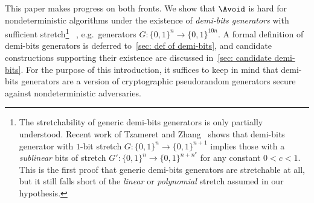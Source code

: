 \documentclass[10pt,a4paper]{article}
\theoremstyle{definition}
\theoremstyle{remark}
\begin{document}
This paper makes progress on both fronts. We show that $\Avoid$ is hard for nondeterministic algorithms under the existence of \emph{demi-bits generators} with sufficient stretch\footnote{The stretchability of generic demi-bits generators is only partially understood. Recent work of Tzameret and Zhang~\cite{tzameret_et_al:LIPIcs.ITCS.2024.95} shows that demi-bits generator with $1$-bit stretch $G : \{0, 1\}^n \to \{0, 1\}^{n+1}$ implies those with a \emph{sublinear} bits of stretch $G': \{0, 1\}^n \to \{0, 1\}^{n + n^c}$ for any constant $0 < c < 1$. This is the first proof that generic demi-bits generators are stretchable at all, but it still falls short of the \emph{linear} or \emph{polynomial} stretch assumed in our hypothesis.}%
~\cite{Rudich97}, e.g.\ generators $G : \{0,1\}^n \to \{0,1\}^{10n}$. A formal definition of demi-bits generators is deferred to~\autoref{sec: def of demi-bits}, and candidate constructions supporting their existence are discussed in~\autoref{sec: candidate demi-bits}. For the purpose of this introduction, it suffices to keep in mind that demi-bits generators are a version of cryptographic pseudorandom generators secure against nondeterministic adversaries. 
\end{document}
